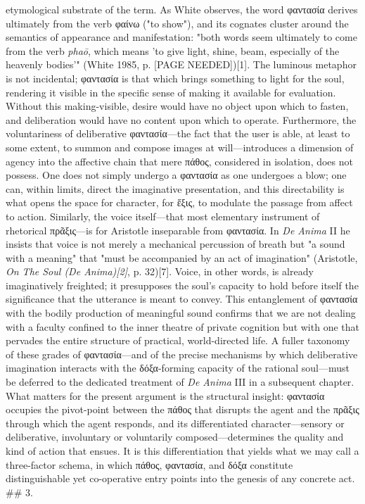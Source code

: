 \documentclass{article}
\begin{document}
etymological substrate of the term. As White observes, the word φαντασία derives ultimately from the verb φαίνω ("to show"), and its cognates cluster around the semantics of appearance and manifestation: "both words seem ultimately to come from the verb \textit{phaō}, which means 'to give light, shine, beam, especially of the heavenly bodies'" (White 1985, p. [PAGE NEEDED])[1]. The luminous metaphor is not incidental; φαντασία is that which brings something to light for the soul, rendering it visible in the specific sense of making it available for evaluation. Without this making-visible, desire would have no object upon which to fasten, and deliberation would have no content upon which to operate. Furthermore, the voluntariness of deliberative φαντασία—the fact that the user is able, at least to some extent, to summon and compose images at will—introduces a dimension of agency into the affective chain that mere πάθος, considered in isolation, does not possess. One does not simply undergo a φαντασία as one undergoes a blow; one can, within limits, direct the imaginative presentation, and this directability is what opens the space for character, for ἕξις, to modulate the passage from affect to action. Similarly, the voice itself—that most elementary instrument of rhetorical πρᾶξις—is for Aristotle inseparable from φαντασία. In \textit{De Anima} II he insists that voice is not merely a mechanical percussion of breath but "a sound with a meaning" that "must be accompanied by an act of imagination" (Aristotle, \textit{On The Soul (De Anima)[2]}, p. 32)[7]. Voice, in other words, is already imaginatively freighted; it presupposes the soul's capacity to hold before itself the significance that the utterance is meant to convey. This entanglement of φαντασία with the bodily production of meaningful sound confirms that we are not dealing with a faculty confined to the inner theatre of private cognition but with one that pervades the entire structure of practical, world-directed life. A fuller taxonomy of these grades of φαντασία—and of the precise mechanisms by which deliberative imagination interacts with the δόξα-forming capacity of the rational soul—must be deferred to the dedicated treatment of \textit{De Anima} III in a subsequent chapter. What matters for the present argument is the structural insight: φαντασία occupies the pivot-point between the πάθος that disrupts the agent and the πρᾶξις through which the agent responds, and its differentiated character—sensory or deliberative, involuntary or voluntarily composed—determines the quality and kind of action that ensues. It is this differentiation that yields what we may call a three-factor schema, in which πάθος, φαντασία, and δόξα constitute distinguishable yet co-operative entry points into the genesis of any concrete act. ## 3. 
\end{document}
